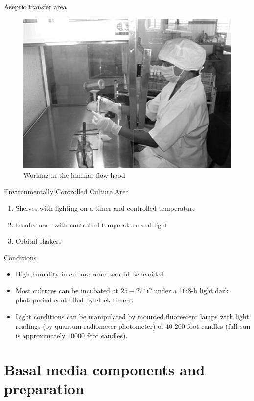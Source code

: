 \documentclass[ignorenonframetext,aspectratio=169]{beamer}
\providecommand{\tightlist}{%
  \setlength{\itemsep}{0pt}\setlength{\parskip}{0pt}}
\begin{document}
\begin{frame}{Aseptic transfer area}
\protect\hypertarget{aseptic-transfer-area-1}{}

\begin{figure}
\includegraphics[width=0.4\linewidth]{../images/laminar_flow_hood} \caption{Working in the laminar flow hood}\label{fig:aseptic-transfer}
\end{figure}

\end{frame}

\begin{frame}{Environmentally Controlled Culture Area}
\protect\hypertarget{environmentally-controlled-culture-area}{}

\begin{enumerate}
\tightlist
\item
  Shelves with lighting on a timer and controlled temperature
\item
  Incubators---with controlled temperature and light
\item
  Orbital shakers
\end{enumerate}

\end{frame}

\begin{frame}{Conditions}
\protect\hypertarget{conditions}{}

\begin{itemize}
\tightlist
\item
  High humidity in culture room should be avoided.
\item
  Most cultures can be incubated at \(25-27~^\circ C\) under a 16:8-h
  light:dark photoperiod controlled by clock timers.
\item
  Light conditions can be manipulated by mounted fluorescent lamps with
  light readings (by quantum radiometer-photometer) of 40-200 foot
  candles (full sun is approximately 10000 foot candles).
\end{itemize}

\end{frame}

\hypertarget{basal-media-components-and-preparation}{%
\section{Basal media components and
preparation}\label{basal-media-components-and-preparation}}
\end{document}
